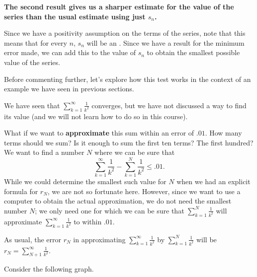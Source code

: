 \documentclass{ximera}
\begin{document}
\textbf{The second result gives us a sharper estimate for the value of the series than the usual estimate using just $s_n$.}

Since we have a positivity assumption on the terms of the series, note that this means that for every $n$, $s_n$ will be an .  Since we have a result for the minimum error made, we can add this to the value of $s_n$ to obtain the smallest possible value of the series.

Before commenting further, let's explore how this test works in the context of an example we have seen in previous sections.

\begin{model}
We have seen that  $\sum_{k=1}^\infty \frac{1}{k^2}$ converges, but we have not discussed a way to find its value (and
we will not learn how to do so in this course). 

What if we want to \textbf{approximate} this sum within an error of
$.01$.  How many terms should we sum?  Is it enough to sum
the first ten terms?  The first hundred?  We want to find a number $N$
where we can be sure that
\[
\sum_{k=1}^\infty \frac{1}{k^2}-\sum_{k=1}^N \frac{1}{k^2} \leq .01.
\]
While we could determine the smallest such value for $N$ when we had an explicit formula for $r_N$, we are not so fortunate here.  However, since we want to use a computer to obtain the actual approximation, we do not need the smallest number $N$; we only need one for which we can be sure that $\sum_{k=1}^N \frac{1}{k^2}$ will approximate $\sum_{k=1}^\infty \frac{1}{k^2}$ to within $.01$.  

As usual, the error $r_N$ in approximating $\sum_{k=1}^\infty \frac{1}{k^2}$ by $\sum_{k=1}^N \frac{1}{k^2}$ will be $r_N= \sum_{N+1}^\infty \frac{1}{k^2}$.

Consider the following graph.

\begin{image}
\end{image}
\end{model}
\end{document}
